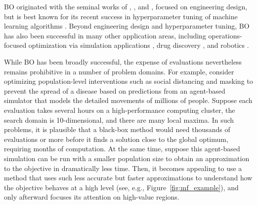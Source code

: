 \documentclass{wscpaperproc}
\newcommand{\savelength}[1]{} %
\theoremstyle{wsc}
\begin{document}
BO originated with the seminal works of
, , and
, focused on engineering design,
but is best known for its recent success in hyperparameter tuning of machine learning algorithms . Beyond engineering design and hyperparameter tuning, BO has also been successful in many  other application areas, including 
operations-focused optimization via simulation applications
,
drug discovery , 
and robotics .

While BO has been broadly successful,
the expense of evaluations nevertheless remains prohibitive
in a number of problem domains.
For example, consider optimizing population-level interventions such as social distancing and masking to prevent the spread of a disease based on predictions from an agent-based simulator that models the detailed movements of millions of people.
Suppose each evaluation takes several hours on a high-performance computing cluster, the search domain is 10-dimensional, and there are many local maxima. In such problems, it is plausible that a black-box method would need thousands of evaluations or more before it finds a solution close to the global optimum, requiring months of computation.
At the same time, suppose this %
agent-based simulation can be run with a smaller population size %
to obtain an approximation to the objective in dramatically less time. \savelength{(The ``mesh size'' describes the level of discretization used to solve the PDE. A larger mesh size corresponds to more discrete points used in the discretization, a more accurate solution, and more computation.)}
Then, it becomes appealing to use a method that uses such less accurate but faster approximations to understand how the objective behaves at a high level (see, e.g., Figure~\ref{fig:mf_example}), and only afterward focuses its attention on high-value regions.
\end{document}
